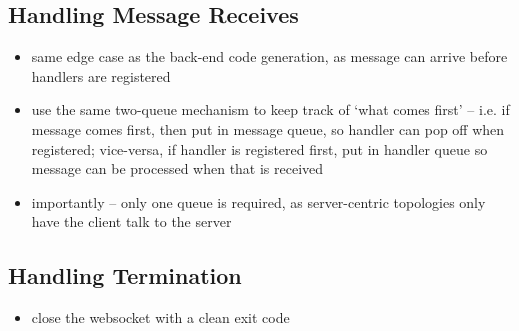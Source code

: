 \subsection{Handling Message Receives}
\begin{itemize}
\item same edge case as the back-end code generation, as message can arrive before handlers are registered
\item use the same two-queue mechanism to keep track of `what comes first' -- i.e. if message comes first, then put in message queue, so handler can pop off when registered; vice-versa, if handler is registered first, put in handler queue so message can be processed when that is received
\item importantly -- only one queue is required, as server-centric topologies only have the client talk to the server
\end{itemize}

\subsection{Handling Termination}
\begin{itemize}
\item close the websocket with a clean exit code
\end{itemize}